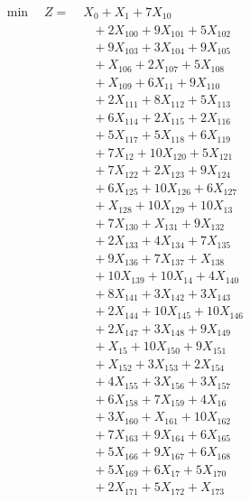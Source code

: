 \documentclass[a4paper,10pt]{article}
\begin{document}
\allowdisplaybreaks
{\small
\begin{align}
\min \quad Z = &\; X_{0} + X_{1} + 7X_{10} \\[0.5ex]
&\quad  + 2X_{100} + 9X_{101} + 5X_{102} \\[0.5ex]
&\quad  + 9X_{103} + 3X_{104} + 9X_{105} \\[0.5ex]
&\quad  + X_{106} + 2X_{107} + 5X_{108} \\[0.5ex]
&\quad  + X_{109} + 6X_{11} + 9X_{110} \\[0.5ex]
&\quad  + 2X_{111} + 8X_{112} + 5X_{113} \\[0.5ex]
&\quad  + 6X_{114} + 2X_{115} + 2X_{116} \\[0.5ex]
&\quad  + 5X_{117} + 5X_{118} + 6X_{119} \\[0.5ex]
&\quad  + 7X_{12} + 10X_{120} + 5X_{121} \\[0.5ex]
&\quad  + 7X_{122} + 2X_{123} + 9X_{124} \\[0.5ex]
&\quad  + 6X_{125} + 10X_{126} + 6X_{127} \\[0.5ex]
&\quad  + X_{128} + 10X_{129} + 10X_{13} \\[0.5ex]
&\quad  + 7X_{130} + X_{131} + 9X_{132} \\[0.5ex]
&\quad  + 2X_{133} + 4X_{134} + 7X_{135} \\[0.5ex]
&\quad  + 9X_{136} + 7X_{137} + X_{138} \\[0.5ex]
&\quad  + 10X_{139} + 10X_{14} + 4X_{140} \\[0.5ex]
&\quad  + 8X_{141} + 3X_{142} + 3X_{143} \\[0.5ex]
&\quad  + 2X_{144} + 10X_{145} + 10X_{146} \\[0.5ex]
&\quad  + 2X_{147} + 3X_{148} + 9X_{149} \\[0.5ex]
&\quad  + X_{15} + 10X_{150} + 9X_{151} \\[0.5ex]
&\quad  + X_{152} + 3X_{153} + 2X_{154} \\[0.5ex]
&\quad  + 4X_{155} + 3X_{156} + 3X_{157} \\[0.5ex]
&\quad  + 6X_{158} + 7X_{159} + 4X_{16} \\[0.5ex]
&\quad  + 3X_{160} + X_{161} + 10X_{162} \\[0.5ex]
&\quad  + 7X_{163} + 9X_{164} + 6X_{165} \\[0.5ex]
&\quad  + 5X_{166} + 9X_{167} + 6X_{168} \\[0.5ex]
&\quad  + 5X_{169} + 6X_{17} + 5X_{170} \\[0.5ex]
&\quad  + 2X_{171} + 5X_{172} + X_{173} \\[0.5ex]

\end{align}}
\end{document}
